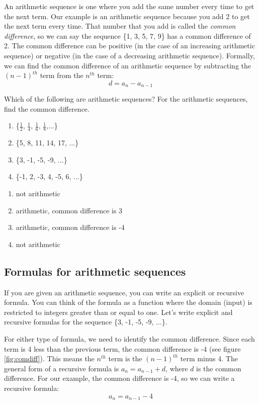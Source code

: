 An arithmetic sequence is one where you add the same number every 
time to get the next term. Our example is an arithmetic sequence 
because you add 2 to get the next term every time. That number that 
you add is called the \textit{common difference}, so we can say the 
sequence \{1, 3, 5, 7, 9\} has a common difference of 2. The common 
difference can be positive (in the case of an increasing arithmetic 
sequence) or negative (in the case of a decreasing arithmetic 
sequence). Formally, we can find the common difference of an 
arithmetic sequence by subtracting the $(n-1)^{th}$ term from the 
$n^{th}$ term: 
$$d = a_n - a_{n-1}$$

\begin{Exercise}[label = seq1]
Which of the following are arithmetic sequences? For the arithmetic 
sequences, find the common difference.
\begin{enumerate}
\item \{$\frac{1}{2}$, $\frac{1}{4}$, $\frac{1}{6}$, $\frac{1}{8}$,...\}
\item \{5, 8, 11, 14, 17, ...\}
\item \{3, -1, -5, -9, ...\}
\item \{-1, 2, -3, 4, -5, 6, ...\}
\end{enumerate}
\end{Exercise}

\begin{Answer}[ref=seq1]
\begin{enumerate}
\item not arithmetic
\item arithmetic, common difference is 3
\item arithmetic, common difference is -4
\item not arithmetic
\end{enumerate}
\end{Answer}


\subsection{Formulas for arithmetic sequences}
If you are given an arithmetic sequence, you can write an explicit or 
recursive formula. You can think of the formula as a function where 
the domain (input) is restricted to integers greater than or equal to 
one. Let's write explicit and recursive formulas for the sequence 
\{3, -1, -5, -9, ...\}. 

For either type of formula, we need to identify the common difference. 
Since each term is 4 less than the previous term, the common 
difference is -4 (see figure \ref{fig:comdiff}). This means the 
$n^{th}$ term is the $(n-1)^{th}$ term minus 4. The general form of a 
recursive formula is $a_n = a_{n-1} + d$, where $d$ is the common 
difference. For our example, the common difference is -4, so we can 
write a recursive formula:
$$a_n = a_{n-1}-4$$

